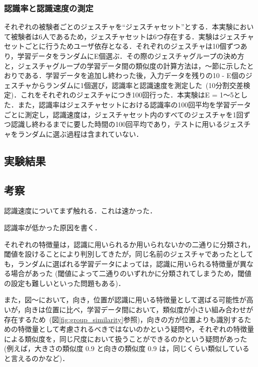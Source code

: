 \subsubsection{認識率と認識速度の測定}
それぞれの被験者ごとのジェスチャを``ジェスチャセット''とする．本実験において被験者は6人であるため，ジェスチャセットは6つ存在する．実験はジェスチャセットごとに行うためユーザ依存となる．それぞれのジェスチャは10個ずつあり，学習データをランダムにE個選ぶ．その際のジェスチャグループの決め方と，ジェスチャグループの学習データ間の類似度の計算方法は，〜節に示したとおりである．学習データを追加し終わった後，入力データを残りの10 - E個のジェスチャからランダムに1個選び，認識率と認識速度を測定した~(10分割交差検定)．これをそれぞれのジェスチャにつき100回行った．本実験はE = 1〜5とした．また，認識率はジェスチャセットにおける認識率の100回平均を学習データごとに測定し，認識速度は，ジェスチャセット内のすべてのジェスチャを1回ずつ認識し終わるまでに要した時間の100回平均であり，テストに用いるジェスチャをランダムに選ぶ過程は含まれていない．


\subsection{実験結果}


\subsection{考察}
認識速度についてまず触れる．これは速かった．

認識率が低かった原因を書く．

それぞれの特徴量は，認識に用いられるか用いられないかの二通りに分類され，閾値を設けることにより判別してきたが，同じ名前のジェスチャであったとしても，ランダムに選ばれる学習データによっては，認識に用いられる特徴量が異なる場合があった (閾値によって二通りのいずれかに分類されてしまうため，閾値の設定も難しいといった問題もある)．

また，図〜において，向き，位置が認識に用いる特徴量として選ばる可能性が高いが，向きは位置に比べ，学習データ間において，類似度が小さい組み合わせが存在するため~(図\ref{fig:group_similarity}参照)，向きの方が位置よりも識別するための特徴量として考慮されるべきではないのかという疑問や，それぞれの特徴量による類似度を，同じ尺度において扱うことができるのかという疑問があった (例えば，大きさの類似度 0.9 と向きの類似度 0.9 は，同じくらい類似していると言えるのかなど)．

